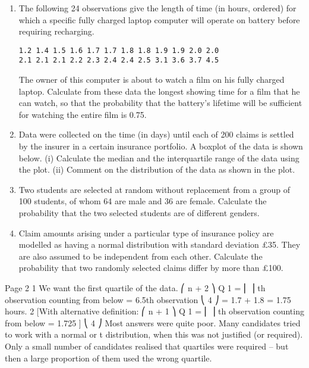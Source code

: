 \documentclass[a4paper,12pt]{article}
\begin{document}
\begin{enumerate}

\item The following 24 observations give the length of time (in hours, ordered) for which a
specific fully charged laptop computer will operate on battery before requiring
recharging.
\begin{verbatim}
1.2 1.4 1.5 1.6 1.7 1.7 1.8 1.8 1.9 1.9 2.0 2.0
2.1 2.1 2.1 2.2 2.3 2.4 2.4 2.5 3.1 3.6 3.7 4.5
\end{verbatim}

The owner of this computer is about to watch a film on his fully charged laptop.
Calculate from these data the longest showing time for a film that he can watch, so
that the probability that the battery's lifetime will be sufficient for watching the entire
film is 0.75.

\item Data were collected on the time (in days) until each of 200 claims is settled by the
insurer in a certain insurance portfolio. A boxplot of the data is shown below.
(i) Calculate the median and the interquartile range of the data using the plot. 
(ii) Comment on the distribution of the data as shown in the plot.

\item 
Two students are selected at random without replacement from a group of 100
students, of whom 64 are male and 36 are female.
Calculate the probability that the two selected students are of different genders.
\item 
Claim amounts arising under a particular type of insurance policy are modelled as
having a normal distribution with standard deviation £35. They are also assumed to be
independent from each other.
Calculate the probability that two randomly selected claims differ by more than £100.
\end{enumerate}
\newpage
Page 2%
1
We want the first quartile of the data.
⎛ n + 2 ⎞
Q 1 = ⎜
⎟ th observation counting from below = 6.5th observation
⎝ 4 ⎠
=
1.7 + 1.8
= 1.75 hours.
2
[With alternative definition:
⎛ n + 1 ⎞
Q 1 = ⎜
⎟ th observation counting from below = 1.725 ]
⎝ 4 ⎠
Most answers were quite poor. Many candidates tried to work with a normal or t distribution,
when this was not justified (or required). Only a small number of candidates realised that
quartiles were required – but then a large proportion of them used the wrong quartile.
\end{document}
